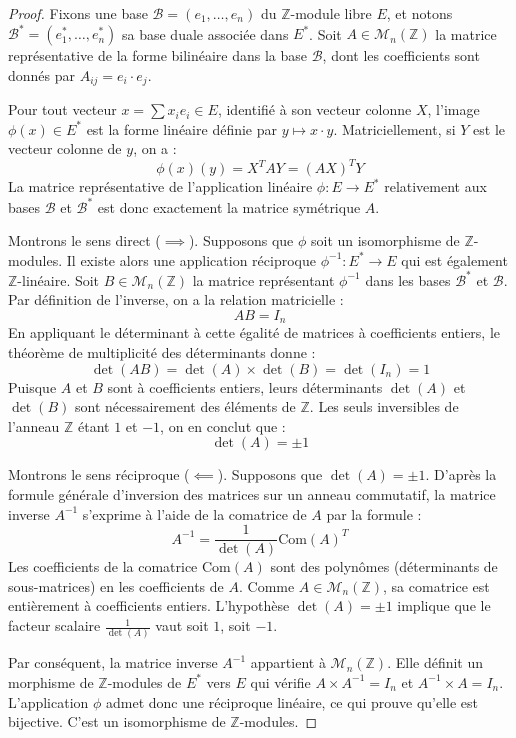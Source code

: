 \begin{proof}
Fixons une base $\mathcal{B} = (e_1, \dots, e_n)$ du $\mathbb{Z}$-module libre $E$, et notons $\mathcal{B}^* = (e_1^*, \dots, e_n^*)$ sa base duale associée dans $E^*$. Soit $A \in \mathcal{M}_n(\mathbb{Z})$ la matrice représentative de la forme bilinéaire dans la base $\mathcal{B}$, dont les coefficients sont donnés par $A_{ij} = e_i \cdot e_j$. 

Pour tout vecteur $x = \sum x_i e_i \in E$, identifié à son vecteur colonne $X$, l'image $\phi(x) \in E^*$ est la forme linéaire définie par $y \mapsto x \cdot y$. Matriciellement, si $Y$ est le vecteur colonne de $y$, on a :
\[
\phi(x)(y) = X^T A Y = (A X)^T Y
\]
La matrice représentative de l'application linéaire $\phi : E \to E^*$ relativement aux bases $\mathcal{B}$ et $\mathcal{B}^*$ est donc exactement la matrice symétrique $A$.

Montrons le sens direct ($\implies$). 
Supposons que $\phi$ soit un isomorphisme de $\mathbb{Z}$-modules. Il existe alors une application réciproque $\phi^{-1} : E^* \to E$ qui est également $\mathbb{Z}$-linéaire. Soit $B \in \mathcal{M}_n(\mathbb{Z})$ la matrice représentant $\phi^{-1}$ dans les bases $\mathcal{B}^*$ et $\mathcal{B}$. Par définition de l'inverse, on a la relation matricielle :
\[
A B = I_n
\] En appliquant le déterminant à cette égalité de matrices à coefficients entiers, le théorème de multiplicité des déterminants donne :
\[
\det(A B) = \det(A) \times \det(B) = \det(I_n) = 1
\]
Puisque $A$ et $B$ sont à coefficients entiers, leurs déterminants $\det(A)$ et $\det(B)$ sont nécessairement des éléments de $\mathbb{Z}$. Les seuls inversibles de l'anneau $\mathbb{Z}$ étant $1$ et $-1$, on en conclut que :
\[
\det(A) = \pm 1
\]

Montrons le sens réciproque ($\impliedby$).
Supposons que $\det(A) = \pm 1$. D'après la formule générale d'inversion des matrices sur un anneau commutatif, la matrice inverse $A^{-1}$ s'exprime à l'aide de la comatrice de $A$ par la formule :
\[
A^{-1} = \frac{1}{\det(A)} \text{Com}(A)^T
\]
Les coefficients de la comatrice $\text{Com}(A)$ sont des polynômes (déterminants de sous-matrices) en les coefficients de $A$. Comme $A \in \mathcal{M}_n(\mathbb{Z})$, sa comatrice est entièrement à coefficients entiers. L'hypothèse $\det(A) = \pm 1$ implique que le facteur scalaire $\frac{1}{\det(A)}$ vaut soit $1$, soit $-1$. 

Par conséquent, la matrice inverse $A^{-1}$ appartient à $\mathcal{M}_n(\mathbb{Z})$. Elle définit un morphisme de $\mathbb{Z}$-modules de $E^*$ vers $E$ qui vérifie $A \times A^{-1} = I_n$ et $A^{-1} \times A = I_n$. L'application $\phi$ admet donc une réciproque linéaire, ce qui prouve qu'elle est bijective. C'est un isomorphisme de $\mathbb{Z}$-modules.
\end{proof}

